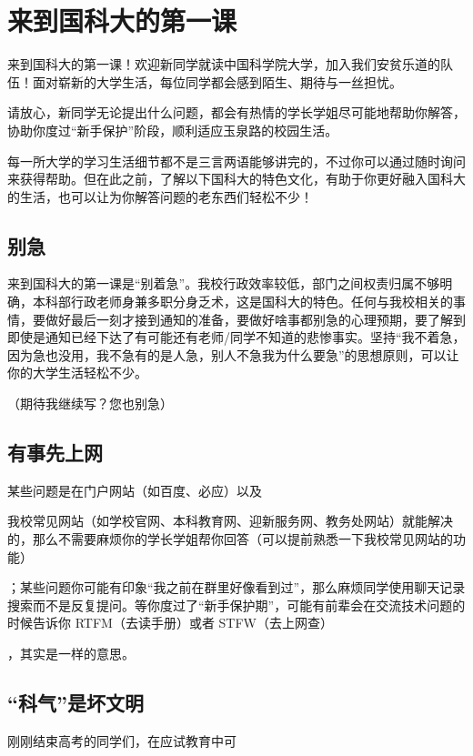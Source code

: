 \chapter{来到国科大的第一课}

来到国科大的第一课！欢迎新同学就读中国科学院大学，加入我们安贫乐道的队伍！面对崭新的大学生活，每位同学都会感到陌生、期待与一丝担忧。

请放心，新同学无论提出什么问题，都会有热情的学长学姐尽可能地帮助你解答，协助你度过“新手保护”阶段，顺利适应玉泉路的校园生活。

每一所大学的学习生活细节都不是三言两语能够讲完的，不过你可以通过随时询问来获得帮助。但在此之前，了解以下国科大的特色文化，有助于你更好融入国科大的生活，也可以让为你解答问题的老东西们轻松不少！

\section{别急}

来到国科大的第一课是“别着急”。我校行政效率较低，部门之间权责归属不够明确，本科部行政老师身兼多职分身乏术，这是国科大的特色。任何与我校相关的事情，要做好最后一刻才接到通知的准备，要做好啥事都别急的心理预期，要了解到即使是通知已经下达了有可能还有老师/同学不知道的悲惨事实。坚持“我不着急，因为急也没用，我不急有的是人急，别人不急我为什么要急”的思想原则，可以让你的大学生活轻松不少。

（期待我继续写？您也别急）

\section{有事先上网}

某些问题是在门户网站（如百度、必应）以及

我校常见网站（如学校官网、本科教育网、迎新服务网、教务处网站）就能解决的，那么不需要麻烦你的学长学姐帮你回答（可以提前熟悉一下我校常见网站的功能）

；某些问题你可能有印象“我之前在群里好像看到过”，那么麻烦同学使用聊天记录搜索而不是反复提问。等你度过了“新手保护期”，可能有前辈会在交流技术问题的时候告诉你 RTFM（去读手册）或者 STFW（去上网查）

，其实是一样的意思。

\section{“科气”是坏文明}

刚刚结束高考的同学们，在应试教育中可

